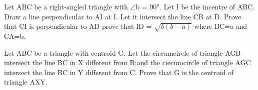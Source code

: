 \item Let ABC be a right-angled triangle with $\angle$b = $90^{o}$. Let I be the incentre of ABC. Draw a line  perpendicular to AI at I. Let it intersect the line CB at D. Prove that CI is perpendicular to AD prove that 
ID = $\sqrt{b(b - a)}$ where BC=a and CA=b.

\item Let ABC be a triangle with centroid G. Let the circumcircle of triangle AGB intersect the line BC in X different from B;and the ciecumcircle of triangle AGC intersect the line BC in Y different from C. Prove that G is the centroid of triangle AXY.

